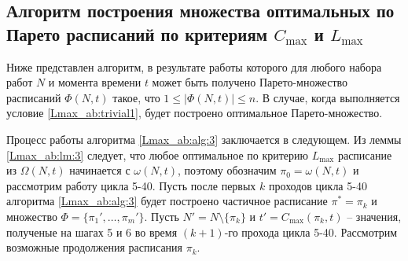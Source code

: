 \subsection{Алгоритм построения множества оптимальных по Парето расписаний по критериям $C_{\max}$ и $L_{\max}$}
Ниже представлен алгоритм, в результате работы которого для любого набора работ $N$ и момента времени $t$ может быть получено Парето-множество расписаний $\Phi(N,t)$ такое, что $1 \leq | \Phi(N,t) | \leq n$. В случае, когда выполняется условие \ref{Lmax_ab:trivial1}, будет построено оптимальное Парето-множество.

Процесс работы алгоритма \ref{Lmax_ab:alg:3} заключается в следующем.
Из леммы \ref{Lmax_ab:lm:3} следует, что любое оптимальное по критерию $L_{\max}$ расписание из $\Omega(N,t)$  начинается с $\omega(N, t)$, поэтому
обозначим $\pi_0 = \omega(N, t)$ и рассмотрим работу цикла 5-40. Пусть после первых $k$ проходов цикла 5-40 алгоритма \ref{Lmax_ab:alg:3} будет построено частичное расписание $\pi^* = \pi_k$ и множество $\Phi = \{\pi_1', \dots, \pi_m'\}$. Пусть $N' = N \setminus \{\pi_k\}$ и $t' = C_{\max}(\pi_k,t)$ -- значения, полученые на шагах 5 и 6 во время $(k+1)$-го прохода цикла 5-40.
Рассмотрим возможные продолжения расписания $\pi_k$.
